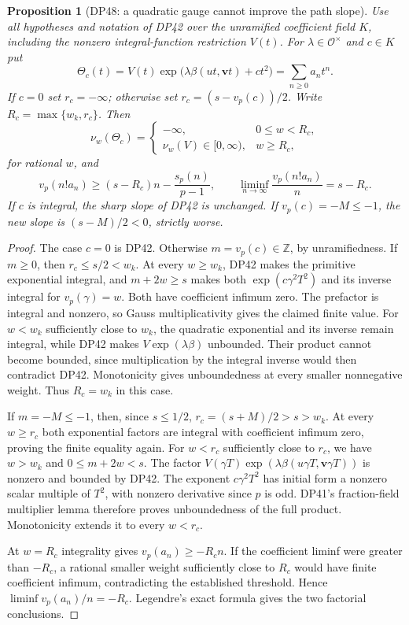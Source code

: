\documentclass[11pt,a4paper]{article}
\newtheorem{proposition}[theorem]{Proposition}
\theoremstyle{definition}\newtheorem{remark}[theorem]{Remark}
\newcommand{\Z}{\mathbb Z}\newcommand{\Q}{\mathbb Q}\newcommand{\F}{\mathbb F}
\newcommand{\vp}{v_p}\newcommand{\dR}{\mathrm{dR}}\newcommand{\crys}{\mathrm{crys}}
\begin{document}
\begin{proposition}[DP48: a quadratic gauge cannot improve the path slope]\label{DP48}
Use all hypotheses and notation of DP42 over the unramified coefficient field $K$, including the nonzero integral-function restriction $V(t)$. For $\lambda\in\mathcal O^\times$ and $c\in K$ put
\[
 \Theta_c(t)=V(t)\exp\bigl(\lambda\beta(ut,\mathbf vt)+ct^2\bigr)
        =\sum_{n\ge0}a_nt^n.
\]
If $c=0$ set $r_c=-\infty$; otherwise set
$r_c=(s-\vp(c))/2$. Write $R_c=\max\{w_k,r_c\}$.
Then
\[
 \nu_w(\Theta_c)=
 \begin{cases}
 -\infty,&0\le w<R_c,\\
 \nu_w(V)\in[0,\infty),&w\ge R_c,
 \end{cases}
\]
for rational $w$, and
\[
 \vp(n!a_n)\ge(s-R_c)n-\frac{s_p(n)}{p-1},\qquad
 \liminf_{n\to\infty}\frac{\vp(n!a_n)}n=s-R_c.
\]
If $c$ is integral, the sharp slope of DP42 is unchanged. If
$\vp(c)=-M\le-1$, the new slope is $(s-M)/2<0$, strictly worse.
\end{proposition}

\begin{proof}
The case $c=0$ is DP42. Otherwise $m=\vp(c)\in\Z$, by unramifiedness.
If $m\ge0$, then $r_c\le s/2<w_k$.
At every $w\ge w_k$, DP42 makes the primitive exponential integral, and $m+2w\ge s$ makes both $\exp(c\gamma^2T^2)$ and its inverse integral for $\vp(\gamma)=w$. Both have coefficient infimum zero. The prefactor is integral and nonzero, so Gauss multiplicativity gives the claimed finite value.
For $w<w_k$ sufficiently close to $w_k$, the quadratic exponential and its inverse remain integral, while DP42 makes $V\exp(\lambda\beta)$ unbounded. Their product cannot become bounded, since multiplication by the integral inverse would then contradict DP42. Monotonicity gives unboundedness at every smaller nonnegative weight. Thus $R_c=w_k$ in this case.

If $m=-M\le-1$, then, since $s\le1/2$,
$r_c=(s+M)/2>s>w_k$.
At every $w\ge r_c$ both exponential factors are integral with coefficient infimum zero, proving the finite equality again.
For $w<r_c$ sufficiently close to $r_c$, we have $w>w_k$ and
$0\le m+2w<s$.
The factor $V(\gamma T)\exp(\lambda\beta(u\gamma T,\mathbf v\gamma T))$ is nonzero and bounded by DP42.
The exponent $c\gamma^2T^2$ has initial form a nonzero scalar multiple of $T^2$, with nonzero derivative since $p$ is odd.
DP41's fraction-field multiplier lemma therefore proves unboundedness of the full product. Monotonicity extends it to every $w<r_c$.

At $w=R_c$ integrality gives $\vp(a_n)\ge-R_cn$.
If the coefficient liminf were greater than $-R_c$, a rational smaller weight sufficiently close to $R_c$ would have finite coefficient infimum, contradicting the established threshold. Hence $\liminf\vp(a_n)/n=-R_c$. Legendre's exact formula gives the two factorial conclusions.
\end{proof}
\end{document}
